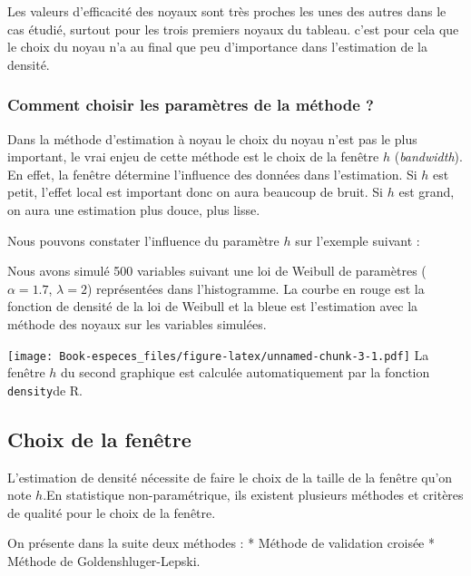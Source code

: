 \documentclass[
]{book}
\begin{document}
\begin{rem}
Les valeurs d'efficacité des noyaux sont très proches les unes des autres dans le cas étudié, surtout pour les trois premiers noyaux du tableau. c'est pour cela que le choix du noyau n'a au final que peu d'importance dans l'estimation de la densité. 
\end{rem}

\hypertarget{comment-choisir-les-paramuxe8tres-de-la-muxe9thode}{%
\subsubsection{Comment choisir les paramètres de la méthode ?}\label{comment-choisir-les-paramuxe8tres-de-la-muxe9thode}}

Dans la méthode d'estimation à noyau le choix du noyau n'est pas le plus important, le vrai enjeu de cette méthode est le choix de la fenêtre \(h\) (\emph{bandwidth}).
En effet, la fenêtre détermine l'influence des données dans l'estimation. Si \(h\) est petit, l'effet local est important donc on aura beaucoup de bruit. Si \(h\) est grand, on aura une estimation plus douce, plus lisse.

Nous pouvons constater l'influence du paramètre \(h\) sur l'exemple suivant :

Nous avons simulé 500 variables suivant une loi de Weibull de paramètres (\(\alpha = 1.7\), \(\lambda=2\)) représentées dans l'histogramme. La courbe en rouge est la fonction de densité de la loi de Weibull et la bleue est l'estimation avec la méthode des noyaux sur les variables simulées.

\texttt{[image: Book-especes\_files/figure-latex/unnamed-chunk-3-1.pdf]}
La fenêtre \(h\) du second graphique est calculée automatiquement par la fonction \texttt{density}de R.

\newpage

\hypertarget{choix-de-la-fenuxeatre}{%
\subsection{Choix de la fenêtre}\label{choix-de-la-fenuxeatre}}

L'estimation de densité nécessite de faire le choix de la taille de la fenêtre qu'on note \(h\).\newline En statistique non-paramétrique, ils existent plusieurs méthodes et critères de qualité pour le choix de la fenêtre.\newline

On présente dans la suite deux méthodes :
* Méthode de validation croisée \newline
* Méthode de Goldenshluger-Lepski.\newline
\end{document}
